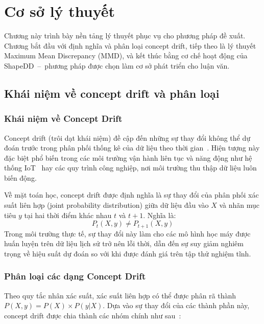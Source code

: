 \chapter{Cơ sở lý thuyết}
\label{chap:theoretical-foundation}

Chương này trình bày nền tảng lý thuyết phục vụ cho phương pháp đề xuất. Chương bắt đầu với định nghĩa và phân loại concept drift, tiếp theo là lý thuyết Maximum Mean Discrepancy (MMD), và kết thúc bằng cơ chế hoạt động của ShapeDD~--~phương pháp được chọn làm cơ sở phát triển cho luận văn.

\section{Khái niệm về concept drift và phân loại}

\subsection{Khái niệm về Concept Drift}
Concept drift (trôi dạt khái niệm) đề cập đến những sự thay đổi không thể dự đoán trước trong phân phối thống kê của dữ liệu theo thời gian~\cite{schlimmer1986incremental}. Hiện tượng này đặc biệt phổ biến trong các môi trường vận hành liên tục và năng động như hệ thống IoT~\cite{ramakrishnan2014enabling} hay các quy trình công nghiệp, nơi môi trường thu thập dữ liệu luôn biến động.

Về mặt toán học, concept drift được định nghĩa là sự thay đổi của phân phối xác suất liên hợp (joint probability distribution) giữa dữ liệu đầu vào $X$ và nhãn mục tiêu $y$ tại hai thời điểm khác nhau $t$ và $t+1$. Nghĩa là: 
\begin{equation}
    P_t(X, y) \neq P_{t+1}(X, y)
\end{equation}
Trong môi trường thực tế, sự thay đổi này làm cho các mô hình học máy được huấn luyện trên dữ liệu lịch sử trở nên lỗi thời, dẫn đến sự suy giảm nghiêm trọng về hiệu suất dự đoán so với khi được đánh giá trên tập thử nghiệm tĩnh.

\subsection{Phân loại các dạng Concept Drift}
Theo quy tắc nhân xác suất, xác suất liên hợp có thể được phân rã thành $P(X, y) = P(X) \times P(y|X)$. Dựa vào sự thay đổi của các thành phần này, concept drift được chia thành các nhóm chính như sau~\cite{hovakimyan2024evolving}:

